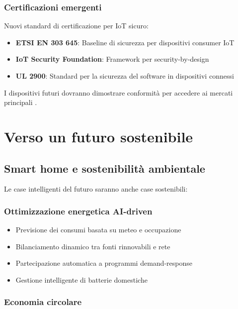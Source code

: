 \subsubsection{Certificazioni emergenti}

Nuovi standard di certificazione per IoT sicuro:

\begin{itemize}
    \item \textbf{ETSI EN 303 645}: Baseline di sicurezza per dispositivi consumer IoT
    \item \textbf{IoT Security Foundation}: Framework per security-by-design
    \item \textbf{UL 2900}: Standard per la sicurezza del software in dispositivi connessi
\end{itemize}

I dispositivi futuri dovranno dimostrare conformità per accedere ai mercati principali \parencite{gdpr2016, nistIotSecurity}.

\section{Verso un futuro sostenibile}

\subsection{Smart home e sostenibilità ambientale}

Le case intelligenti del futuro saranno anche case sostenibili:

\subsubsection{Ottimizzazione energetica AI-driven}

\begin{itemize}
    \item Previsione dei consumi basata su meteo e occupazione
    \item Bilanciamento dinamico tra fonti rinnovabili e rete
    \item Partecipazione automatica a programmi demand-response
    \item Gestione intelligente di batterie domestiche
\end{itemize}

\subsubsection{Economia circolare}


